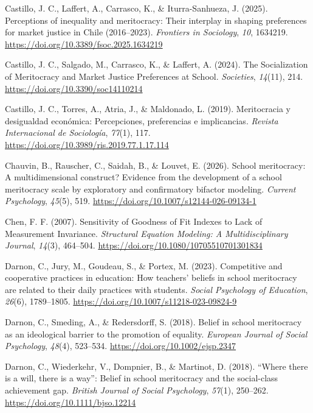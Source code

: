 \documentclass[
  13pt,
]{article}
\newlength{\cslhangindent}
\newenvironment{CSLReferences}[2] %
 {\begin{list}{}{%
  \setlength{\itemindent}{0pt}
  \setlength{\leftmargin}{0pt}
  \setlength{\parsep}{0pt}
  \ifodd #1
   \setlength{\leftmargin}{\cslhangindent}
   \setlength{\itemindent}{-1\cslhangindent}
  \fi
  \setlength{\itemsep}{#2\baselineskip}}}
 {\end{list}}
\begin{document}
\begin{CSLReferences}{1}{0}
Castillo, J. C., Laffert, A., Carrasco, K., \& Iturra-Sanhueza, J.
(2025). Perceptions of inequality and meritocracy: Their interplay in
shaping preferences for market justice in {Chile} (2016--2023).
\emph{Frontiers in Sociology}, \emph{10}, 1634219.
\url{https://doi.org/10.3389/fsoc.2025.1634219}

Castillo, J. C., Salgado, M., Carrasco, K., \& Laffert, A. (2024). The
{Socialization} of {Meritocracy} and {Market Justice Preferences} at
{School}. \emph{Societies}, \emph{14}(11), 214.
\url{https://doi.org/10.3390/soc14110214}

Castillo, J. C., Torres, A., Atria, J., \& Maldonado, L. (2019).
Meritocracia y desigualdad económica: {Percepciones}, preferencias e
implicancias. \emph{Revista Internacional de Sociología}, \emph{77}(1),
117. \url{https://doi.org/10.3989/ris.2019.77.1.17.114}

Chauvin, B., Rauscher, C., Saidah, B., \& Louvet, E. (2026). School
meritocracy: A multidimensional construct? {Evidence} from the
development of a school meritocracy scale by exploratory and
confirmatory bifactor modeling. \emph{Current Psychology}, \emph{45}(5),
519. \url{https://doi.org/10.1007/s12144-026-09134-1}

Chen, F. F. (2007). Sensitivity of {Goodness} of {Fit Indexes} to {Lack}
of {Measurement Invariance}. \emph{Structural Equation Modeling: A
Multidisciplinary Journal}, \emph{14}(3), 464--504.
\url{https://doi.org/10.1080/10705510701301834}

Darnon, C., Jury, M., Goudeau, S., \& Portex, M. (2023). Competitive and
cooperative practices in education: {How} teachers' beliefs in school
meritocracy are related to their daily practices with students.
\emph{Social Psychology of Education}, \emph{26}(6), 1789--1805.
\url{https://doi.org/10.1007/s11218-023-09824-9}

Darnon, C., Smeding, A., \& Redersdorff, S. (2018). Belief in school
meritocracy as an ideological barrier to the promotion of equality.
\emph{European Journal of Social Psychology}, \emph{48}(4), 523--534.
\url{https://doi.org/10.1002/ejsp.2347}

Darnon, C., Wiederkehr, V., Dompnier, B., \& Martinot, D. (2018).
{``{Where} there is a will, there is a way''}: {Belief} in school
meritocracy and the social-class achievement gap. \emph{British Journal
of Social Psychology}, \emph{57}(1), 250--262.
\url{https://doi.org/10.1111/bjso.12214}


\end{CSLReferences}
\end{document}

